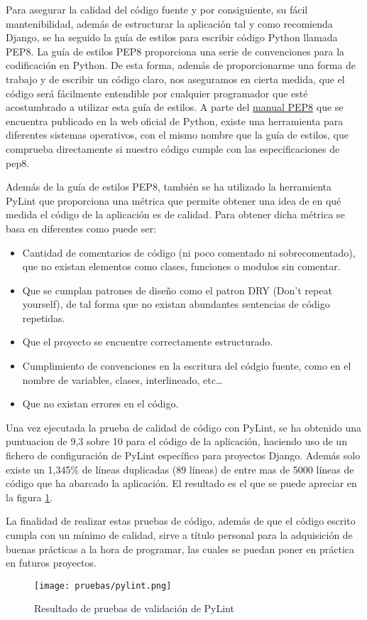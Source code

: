 Para asegurar la calidad del código fuente y por consiguiente, su fácil
mantenibilidad, además de estructurar la aplicación tal y como recomienda Django,
se ha seguido la guía de estilos para escribir código Python llamada PEP8. La
guía de estilos PEP8 proporciona una serie de convenciones para la codificación
en Python. De esta forma, además de proporcionarme una forma de trabajo y de
escribir un código claro, nos aseguramos en cierta medida, que el código será
fácilmente entendible por cualquier programador que esté acostumbrado a utilizar
esta guía de estilos. A parte del
\href{http://www.python.org/dev/peps/pep-0008/}{manual PEP8} que se encuentra
publicado en la web oficial de Python, existe una herramienta para diferentes
sistemas operativos, con el mismo nombre que la guía de estilos, que comprueba
directamente si nuestro código cumple con las especificaciones de pep8.

Además de la guía de estilos PEP8, también se ha utilizado la herramienta PyLint
que proporciona una métrica que permite obtener una idea de en qué medida el
código de la aplicación es de calidad. Para obtener dicha métrica se basa en
diferentes como puede ser:
\begin{itemize}
    \item Cantidad de comentarios de código (ni poco comentado ni
        sobrecomentado), que no existan elementos como clases, funciones o
        modulos sin comentar.
    \item Que se cumplan patrones de diseño como el patron DRY (Don't repeat
        yourself), de tal forma que no existan abundantes sentencias de código
        repetidas.
    \item Que el proyecto se encuentre correctamente estructurado.
    \item Cumplimiento de convenciones en la escritura del códgio fuente, como
        en el nombre de variables, clases, interlineado, etc\ldots
    \item Que no existan errores en el código.
\end{itemize}

Una vez ejecutada la prueba de calidad de código con PyLint, se ha obtenido una
puntuacion de 9,3 sobre 10 para el código de la aplicación, haciendo uso de un
fichero de configuración de PyLint específico para proyectos Django. Además solo
existe un 1,345\% de líneas duplicadas (89 líneas) de entre mas de 5000 líneas
de código que ha abarcado la aplicación. El resultado es el que se puede
apreciar en la figura \ref{fig:pylint}.

La finalidad de realizar estas pruebas de código, además de que el código
escrito cumpla con un mínimo de calidad, sirve a título personal para la
adquisición de buenas prácticas a la hora de programar, las cuales se puedan
poner en práctica en futuros proyectos.

\begin{figure}[H]
    \begin{center}
        \texttt{[image: pruebas/pylint.png]}
    \end{center}
    \caption{Resultado de pruebas de validación de PyLint}
    \label{fig:pylint}
\end{figure}

